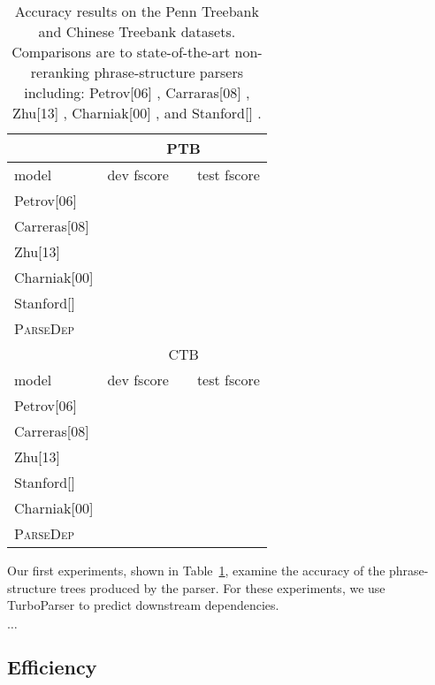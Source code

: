 \documentclass[11pt,letterpaper]{article}
\begin{document}
\begin{table}
  \centering

  \begin{tabular}{|l|lll|}
    \hline
    & \multicolumn{3}{|c|}{PTB} \\
    \hline

    \hline
    model &  dev fscore & & test fscore  \\
    \hline
    Petrov[06] \nocite{petrov2006learning} & & & \\
    Carreras[08] \nocite{carreras2008tag} & & & \\
    Zhu[13] \nocite{zhu2013fast} & &  & \\
    Charniak[00] \nocite{charniak2000maximum} & & & \\
    Stanford[] & & & \\
    \textsc{ParseDep} & & & \\
    \hline
    \hline
    & \multicolumn{3}{|c|}{CTB} \\
    model &  dev fscore & & test fscore  \\
    \hline

    \hline
    Petrov[06] \nocite{petrov2006learning} & & & \\
    Carreras[08] \nocite{carreras2008tag} & & & \\
    Zhu[13] \nocite{zhu2013fast} & &  & \\
    Stanford[] & & & \\
    Charniak[00] \nocite{charniak2000maximum} & & & \\
    \textsc{ParseDep} & & & \\
    \hline
  \end{tabular}
  \label{tab:acc}
  \caption{ Accuracy results on the Penn Treebank and Chinese Treebank datasets. Comparisons are to state-of-the-art non-reranking phrase-structure parsers including:  Petrov[06] \cite{petrov2006learning}, Carraras[08] \cite{carreras2008tag}, Zhu[13] \cite{zhu2013fast}, Charniak[00] \cite{charniak2000maximum}, and Stanford[] \cite{}.    }
\end{table}

Our first experiments, shown in Table~\ref{tab:acc}, examine the accuracy of the phrase-structure trees produced by the parser. For these experiments,
we use TurboParser \cite{martins2013turning} to predict downstream dependencies.

$\ldots$


\subsection{Efficiency}
\end{document}

